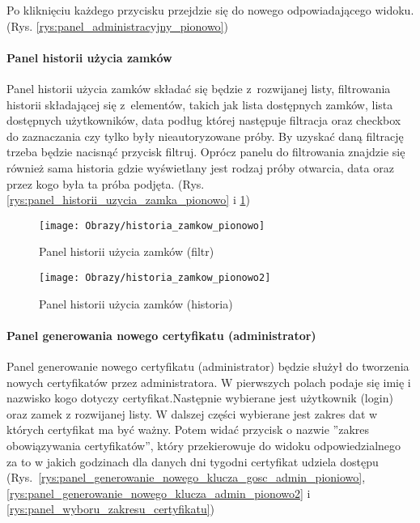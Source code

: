 \documentclass[twoside,10pt]{article}
\begin{document}
Po kliknięciu każdego przycisku przejdzie się do nowego odpowiadającego widoku. (Rys. \ref{rys:panel_administracyjny_pionowo})

\newpage

\paragraph*{Panel historii użycia zamków}
Panel historii użycia zamków składać się będzie z~rozwijanej listy, filtrowania historii składającej się z~elementów, takich jak lista dostępnych zamków, lista dostępnych użytkowników, data podług której następuje filtracja oraz checkbox do zaznaczania czy tylko były nieautoryzowane próby. By uzyskać daną filtrację trzeba będzie nacisnąć przycisk filtruj. Oprócz panelu do filtrowania znajdzie się również sama historia gdzie wyświetlany jest rodzaj próby otwarcia, data oraz przez kogo była ta próba podjęta. (Rys. \ref{rys:panel_historii_uzycia_zamka_pionowo} i \ref{rys:panel_historii_uzycia_zamka_pionowo2})

\begin{figure}[ht!]
\begin{minipage}{0.45\textwidth}
\texttt{[image: Obrazy/historia\_zamkow\_pionowo]}
\caption{Panel historii użycia zamków (filtr)}
\label{rys:panel_historii_uzycia_zamka_pionowo}
\end{minipage}
\hspace{0.1\textwidth}
\begin{minipage}{0.45\textwidth}
\texttt{[image: Obrazy/historia\_zamkow\_pionowo2]}
\caption{Panel historii użycia zamków (historia)}
\label{rys:panel_historii_uzycia_zamka_pionowo2}
\end{minipage}
\end{figure}
\newpage

\paragraph*{Panel generowania nowego certyfikatu (administrator)}
Panel generowanie nowego certyfikatu (administrator) będzie służył do tworzenia nowych certyfikatów przez administratora. W pierwszych polach podaje się imię i nazwisko kogo dotyczy certyfikat.Następnie wybierane jest użytkownik (login) oraz zamek z rozwijanej listy. W dalszej części wybierane jest zakres dat w których certyfikat ma być ważny. Potem widać przycisk o nazwie ''zakres obowiązywania certyfikatów'', który przekierowuje do widoku odpowiedzialnego za to w jakich godzinach dla danych dni tygodni certyfikat udziela dostępu (Rys.~\ref{rys:panel_generowanie_nowego_klucza_gosc_admin_pioniowo}, \ref{rys:panel_generowanie_nowego_klucza_admin_pionowo2} i 
\ref{rys:panel_wyboru_zakresu_certyfikatu})
\end{document}
